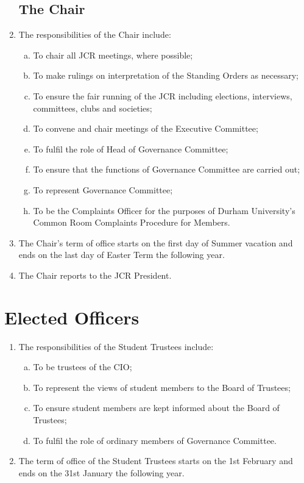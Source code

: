 \documentclass[12pt]{article}
\begin{document}
\begin{enumerate}
    \subsection{The Chair}
    \item The responsibilities of the Chair include:
    \begin{enumerate}[(a)]
        \item To chair all JCR meetings, where possible;
        \item To make rulings on interpretation of the Standing Orders as necessary;
        \item To ensure the fair running of the JCR including elections, interviews, committees, clubs and societies;
        \item To convene and chair meetings of the Executive Committee;
        \item To fulfil the role of Head of Governance Committee;
        \item To ensure that the functions of Governance Committee are carried out;
        \item To represent Governance Committee;
        \item To be the Complaints Officer for the purposes of Durham University’s Common Room Complaints Procedure for Members.
    \end{enumerate}
    \item The Chair's term of office starts on the first day of Summer vacation and ends on the last day of Easter Term the following year.
    \item The Chair reports to the JCR President.
\end{enumerate}
\newpage


\section{Elected Officers}
\begin{enumerate}
    \subsection{Student Trustees}
    \item The responsibilities of the Student Trustees include:
    \begin{enumerate}[(a)]
        \item To be trustees of the CIO;
        \item To represent the views of student members to the Board of Trustees;
        \item To ensure student members are kept informed about the Board of Trustees;
        \item To fulfil the role of ordinary members of Governance Committee.
    \end{enumerate}
    \item The term of office of the Student Trustees starts on the 1st February and ends on the 31st January the following year.
\end{enumerate}
\end{document}
